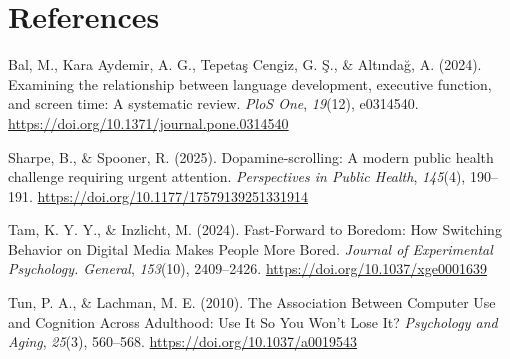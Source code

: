 \documentclass[12pt,letterpaper]{article}
\begin{document}
\newpage
\section*{References}

\setlength{\parindent}{0pt}
\setlength{\parskip}{1em}
\setlength{\leftskip}{0pt}

\hangindent=0.5in
Bal, M., Kara Aydemir, A. G., Tepetaş Cengiz, G. Ş., \& Altındağ, A. (2024). Examining the relationship between language development, executive function, and screen time: A systematic review. \emph{PloS One}, \emph{19}(12), e0314540. \url{https://doi.org/10.1371/journal.pone.0314540}

\hangindent=0.5in
Sharpe, B., \& Spooner, R. (2025). Dopamine-scrolling: A modern public health challenge requiring urgent attention. \emph{Perspectives in Public Health}, \emph{145}(4), 190--191. \url{https://doi.org/10.1177/17579139251331914}

\hangindent=0.5in
Tam, K. Y. Y., \& Inzlicht, M. (2024). Fast-Forward to Boredom: How Switching Behavior on Digital Media Makes People More Bored. \emph{Journal of Experimental Psychology. General}, \emph{153}(10), 2409--2426. \url{https://doi.org/10.1037/xge0001639}

\hangindent=0.5in
Tun, P. A., \& Lachman, M. E. (2010). The Association Between Computer Use and Cognition Across Adulthood: Use It So You Won't Lose It? \emph{Psychology and Aging}, \emph{25}(3), 560--568. \url{https://doi.org/10.1037/a0019543}
\end{document}
